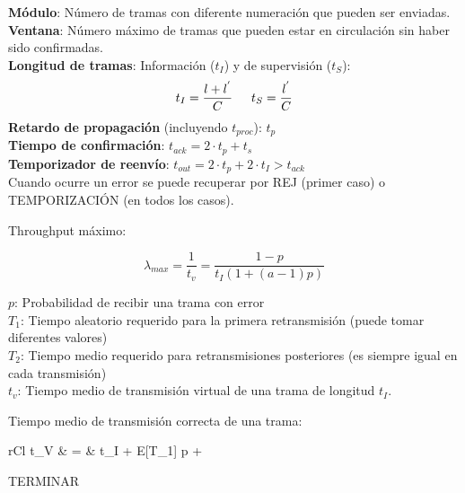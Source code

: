 \documentclass[10pt,landscape]{article}
\begin{document}
\begin{multicols}{3}
\textbf{Módulo}: Número de tramas con diferente numeración que pueden ser enviadas.\\
\textbf{Ventana}: Número máximo de tramas que pueden estar en circulación sin haber sido confirmadas.\\
\textbf{Longitud de tramas}: Información ($t_{I}$) y de supervisión ($t_{S}$):
	\begin{equation*}
		t_{I} = \frac{l + l^{'}}{C} \hspace{15 pt} t_{S} = \frac{l^{'}}{C}
	\end{equation*}
\textbf{Retardo de propagación} (incluyendo $t_{proc}$): $t_{p}$\\
\textbf{Tiempo de confirmación}: $t_{ack} = 2 \cdot t_{p} + t_{s}$\\
\textbf{Temporizador de reenvío}: $t_{out} = 2 \cdot t_{p} + 2 \cdot t_{I} > t_{ack}$\\
	
Cuando ocurre un error se puede recuperar por REJ (primer caso) o TEMPORIZACIÓN (en todos los casos).
	
Throughput máximo:

	\begin{equation*}
	\lambda_{max} = \frac{1}{t_{v}} = \frac{1 - p}{t_{I} (1 + (a - 1)p)}
	\end{equation*}

$p$: Probabilidad de recibir una trama con error\\
$T_{1}$: Tiempo aleatorio requerido para la primera retransmisión (puede tomar diferentes valores)\\
$T_{2}$: Tiempo medio requerido para retransmisiones posteriores (es siempre igual en cada transmisión)\\
$t_{v}$: Tiempo medio de transmisión virtual de una trama de longitud $t_{I}$.


Tiempo medio de transmisión correcta de una trama:

	\begin{IEEEeqnarray*}{rCl}
		t_{V} & = & t_{I} + E[T_{1}] p + 
	\end{IEEEeqnarray*}	


\Large{TERMINAR}















\end{multicols}
\end{document}
